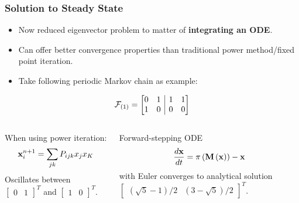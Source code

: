 \documentclass{beamer}
\begin{document}
\begin{frame}
  \frametitle{Solution to Steady State}
  \begin{itemize}
  \item Now reduced eigenvector problem to matter of \textbf{integrating an ODE}.
  \item Can offer better convergence properties than traditional power method/fixed point iteration.
  \item Take following periodic Markov chain as example:
  \end{itemize}
  \[ \mathcal{F}_{\left(1\right)} =
    \left[
      \begin{array}{@{}cc|cc@{}}
        0 & 1 & 1 & 1 \\
        1 & 0 & 0 & 0
      \end{array}
    \right]
  \]

  \begin{columns}
    \begin{column}{0.5\linewidth}
      When using power iteration:
      \[ {\bf x}^{n+1}_i = \sum_{jk} P_{ijk}x_jx_K \]
      Oscillates between $\begin{bmatrix}0&1\end{bmatrix}^T$ and $\begin{bmatrix}1&0\end{bmatrix}^T$.
    \end{column}
    \begin{column}{0.5\linewidth}
      Forward-stepping ODE
      \[ \frac{d{\bf x}}{dt} = \pi\left({\bf M}\left({\bf x}\right)\right) - {\bf x} \]
      with Euler converges to analytical solution $\begin{bmatrix} \left(\sqrt{5}-1\right)/2 & \left(3-\sqrt{5}\right)/2  \end{bmatrix}^T$.
    \end{column}
  \end{columns}
\end{frame}
\end{document}
